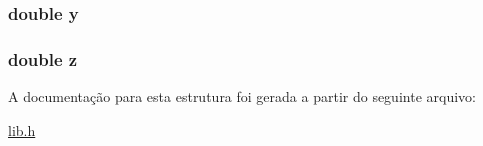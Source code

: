 \subsubsection[{\texorpdfstring{y}{y}}]{\setlength{\rightskip}{0pt plus 5cm}double y}\hypertarget{structdbPoint_ab927965981178aa1fba979a37168db2a}{}\label{structdbPoint_ab927965981178aa1fba979a37168db2a}
\subsubsection[{\texorpdfstring{z}{z}}]{\setlength{\rightskip}{0pt plus 5cm}double z}\hypertarget{structdbPoint_ab3e6ed577a7c669c19de1f9c1b46c872}{}\label{structdbPoint_ab3e6ed577a7c669c19de1f9c1b46c872}


A documentação para esta estrutura foi gerada a partir do seguinte arquivo\+:\begin{DoxyCompactItemize}
\item 
\hyperlink{lib_8h}{lib.\+h}\end{DoxyCompactItemize}
